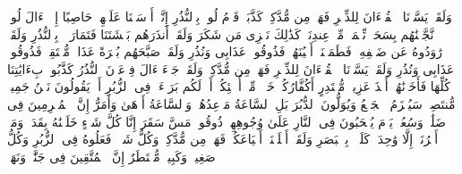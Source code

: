 \stopbuffer%
\startbuffer[\q:54:32]
وَلَقَدۡ یَسَّرۡنَا ٱلۡقُرۡءَانَ لِلذِّكۡرِ فَهَلۡ مِن مُّدَّكِرࣲ%
\stopbuffer%
\startbuffer[\q:54:33]
كَذَّبَتۡ قَوۡمُ لُوطِۭ بِٱلنُّذُرِ%
\stopbuffer%
\startbuffer[\q:54:34]
إِنَّاۤ أَرۡسَلۡنَا عَلَیۡهِمۡ حَاصِبًا إِلَّاۤ ءَالَ لُوطࣲۖ نَّجَّیۡنَٰهُم بِسَحَرࣲ%
\stopbuffer%
\startbuffer[\q:54:35]
نِّعۡمَةࣰ مِّنۡ عِندِنَاۚ كَذَٰلِكَ نَجۡزِی مَن شَكَرَ%
\stopbuffer%
\startbuffer[\q:54:36]
وَلَقَدۡ أَنذَرَهُم بَطۡشَتَنَا فَتَمَارَوۡا۟ بِٱلنُّذُرِ%
\stopbuffer%
\startbuffer[\q:54:37]
وَلَقَدۡ رَٰوَدُوهُ عَن ضَیۡفِهِۦ فَطَمَسۡنَاۤ أَعۡیُنَهُمۡ فَذُوقُوا۟ عَذَابِی وَنُذُرِ%
\stopbuffer%
\startbuffer[\q:54:38]
وَلَقَدۡ صَبَّحَهُم بُكۡرَةً عَذَابࣱ مُّسۡتَقِرࣱّ%
\stopbuffer%
\startbuffer[\q:54:39]
فَذُوقُوا۟ عَذَابِی وَنُذُرِ%
\stopbuffer%
\startbuffer[\q:54:40]
وَلَقَدۡ یَسَّرۡنَا ٱلۡقُرۡءَانَ لِلذِّكۡرِ فَهَلۡ مِن مُّدَّكِرࣲ%
\stopbuffer%
\startbuffer[\q:54:41]
وَلَقَدۡ جَاۤءَ ءَالَ فِرۡعَوۡنَ ٱلنُّذُرُ%
\stopbuffer%
\startbuffer[\q:54:42]
كَذَّبُوا۟ بِءَایَٰتِنَا كُلِّهَا فَأَخَذۡنَٰهُمۡ أَخۡذَ عَزِیزࣲ مُّقۡتَدِرٍ%
\stopbuffer%
\startbuffer[\q:54:43]
أَكُفَّارُكُمۡ خَیۡرࣱ مِّنۡ أُو۟لَٰۤئِكُمۡ أَمۡ لَكُم بَرَاۤءَةࣱ فِی ٱلزُّبُرِ%
\stopbuffer%
\startbuffer[\q:54:44]
أَمۡ یَقُولُونَ نَحۡنُ جَمِیعࣱ مُّنتَصِرࣱ%
\stopbuffer%
\startbuffer[\q:54:45]
سَیُهۡزَمُ ٱلۡجَمۡعُ وَیُوَلُّونَ ٱلدُّبُرَ%
\stopbuffer%
\startbuffer[\q:54:46]
بَلِ ٱلسَّاعَةُ مَوۡعِدُهُمۡ وَٱلسَّاعَةُ أَدۡهَىٰ وَأَمَرُّ%
\stopbuffer%
\startbuffer[\q:54:47]
إِنَّ ٱلۡمُجۡرِمِینَ فِی ضَلَٰلࣲ وَسُعُرࣲ%
\stopbuffer%
\startbuffer[\q:54:48]
یَوۡمَ یُسۡحَبُونَ فِی ٱلنَّارِ عَلَىٰ وُجُوهِهِمۡ ذُوقُوا۟ مَسَّ سَقَرَ%
\stopbuffer%
\startbuffer[\q:54:49]
إِنَّا كُلَّ شَیۡءٍ خَلَقۡنَٰهُ بِقَدَرࣲ%
\stopbuffer%
\startbuffer[\q:54:50]
وَمَاۤ أَمۡرُنَاۤ إِلَّا وَٰحِدَةࣱ كَلَمۡحِۭ بِٱلۡبَصَرِ%
\stopbuffer%
\startbuffer[\q:54:51]
وَلَقَدۡ أَهۡلَكۡنَاۤ أَشۡیَاعَكُمۡ فَهَلۡ مِن مُّدَّكِرࣲ%
\stopbuffer%
\startbuffer[\q:54:52]
وَكُلُّ شَیۡءࣲ فَعَلُوهُ فِی ٱلزُّبُرِ%
\stopbuffer%
\startbuffer[\q:54:53]
وَكُلُّ صَغِیرࣲ وَكَبِیرࣲ مُّسۡتَطَرٌ%
\stopbuffer%
\startbuffer[\q:54:54]
إِنَّ ٱلۡمُتَّقِینَ فِی جَنَّٰتࣲ وَنَهَرࣲ%
\stopbuffer%
